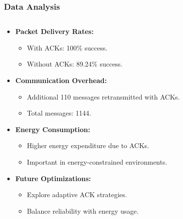 \begin{frame}
    \frametitle{Data Analysis}
    \begin{columns}[T] %
        \begin{column}{.48\textwidth} %
            \begin{itemize}
                \item \textbf{Packet Delivery Rates:}
                \begin{itemize}
                    \item With ACKs: 100\% success.
                    \item Without ACKs: 89.24\% success.
                \end{itemize}
                \item \textbf{Communication Overhead:}
                \begin{itemize}
                    \item Additional 110 messages retransmitted with ACKs.
                    \item Total messages: 1144.
                \end{itemize}
                \item \textbf{Energy Consumption:}
                \begin{itemize}
                    \item Higher energy expenditure due to ACKs.
                    \item Important in energy-constrained environments.
                \end{itemize}
                \item \textbf{Future Optimizations:}
                \begin{itemize}
                    \item Explore adaptive ACK strategies.
                    \item Balance reliability with energy usage.
                \end{itemize}
            \end{itemize}
        \end{column}
        \begin{column}{.48\textwidth} %
            \begin{figure}
                \centering

\end{figure}
\end{column}
\end{columns}
\end{frame}
